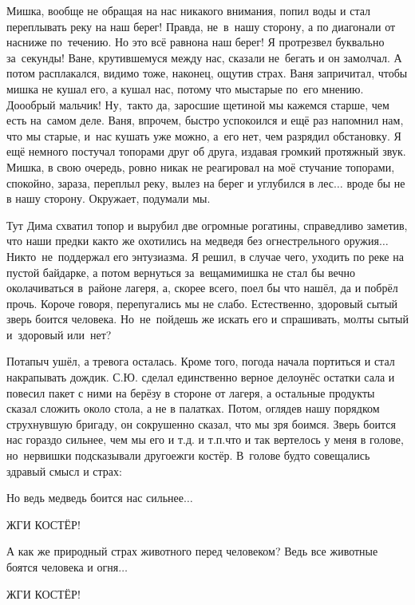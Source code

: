 Мишка, вообще не обращая на нас никакого внимания, попил воды и стал переплывать реку на наш берег! Правда, не~в~нашу сторону, а по диагонали от нас\mdash ниже по~течению. Но это всё равно\mdash на наш берег! Я протрезвел буквально за~секунды! Ване, крутившемуся между нас, сказали не~бегать и он замолчал. А потом расплакался, видимо тоже, наконец, ощутив страх. Ваня запричитал, чтобы мишка не кушал его, а кушал нас, потому что мы\mdash старые по~его мнению. До\sdash о\sdash о\sdash брый мальчик! Ну,~так\sdash то да, заросшие щетиной мы кажемся старше, чем есть на~самом деле. Ваня, впрочем, быстро успокоился и ещё раз напомнил нам, что мы старые, и~нас кушать уже можно, а~его нет, чем разрядил обстановку. Я ещё немного постучал топорами друг об друга, издавая громкий протяжный звук. Мишка, в свою очередь, ровно никак не реагировал на моё стучание топорами, спокойно, зараза, переплыл реку, вылез на берег и углубился в лес$\ldots$ вроде бы не в нашу сторону. Окружает, подумали мы.

Тут Дима схватил топор и вырубил две огромные рогатины, справедливо заметив, что наши предки как\sdash то же охотились на медведя без огнестрельного оружия$\ldots$ Никто~не~поддержал его энтузиазма. Я решил, в случае чего, уходить по реке на пустой байдарке, а потом вернуться за~вещами\mdash мишка не стал бы вечно околачиваться в~районе лагеря, а, скорее всего, поел бы что нашёл, да и побрёл прочь. Короче говоря, перепугались мы не слабо. Естественно, здоровый сытый зверь боится человека. Но~не~пойдешь же искать его и спрашивать, мол\mdash ты сытый и~здоровый или~нет? 

Потапыч ушёл, а тревога осталась. Кроме того, погода начала портиться и стал накрапывать дождик. С.Ю. сделал единственно верное дело\mdash унёс остатки сала и повесил пакет с ними на берёзу в стороне от лагеря, а остальные продукты сказал сложить около стола, а не в палатках. Потом, оглядев нашу порядком струхнувшую бригаду, он сокрушенно сказал, что мы зря боимся. Зверь боится нас гораздо сильнее, чем мы его и т.д. и т.п.\mdash что и так вертелось у меня в голове, но~нервишки подсказывали другое\mdash жги костёр. В~голове будто совещались здравый смысл и страх:

\diagdash Но ведь медведь боится нас сильнее$\ldots$  

\diagdash ЖГИ КОСТЁР! 

\diagdash А как же природный страх животного перед человеком? Ведь все животные боятся человека и огня$\ldots$  

\diagdash Ж\sdash Г\sdash И \enspace К\sdash О\sdash С\sdash Т\sdash Ё\sdash Р!

